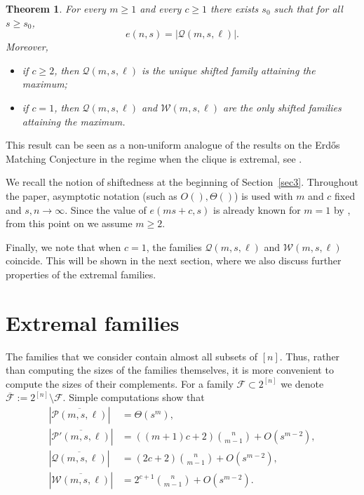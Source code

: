 \documentclass[12pt,a4paper]{article}
\newtheorem{theorem}{Theorem}
\begin{document}
\begin{theorem} \label{t.main}
For every $m\ge 1$ and every $c\ge 1$ there exists $s_0$ such that for all $s\ge s_0$,
\[
e(n,s)=|\mathcal Q(m,s,\ell)|.
\]
Moreover,
\begin{itemize}
    \item if $c\ge 2$, then $\mathcal Q(m,s,\ell)$ is the unique shifted family attaining the maximum;
    \item if $c=1$, then $\mathcal Q(m,s,\ell)$ and $\mathcal W(m,s,\ell)$ are the only shifted families attaining the maximum.
\end{itemize}
\end{theorem}
This result can be seen as a non-uniform analogue of the results on the Erd\H os Matching Conjecture in the regime when the clique is extremal, see \cite{Frankl_perfect_EMC, KoKu}. 

We recall the notion of shiftedness at the beginning of Section~\ref{sec3}. Throughout the paper, asymptotic notation (such as $O(), \Theta()$) is used with $m$ and $c$ fixed and $s,n\to\infty$. Since the value of $e(ms+c,s)$ is already known for $m=1$ by \cite{FK9}, from this point on we assume $m\ge 2$.

Finally, we note that when $c=1$, the families $\mathcal Q(m,s,\ell)$ and $\mathcal W(m,s,\ell)$ coincide. This will be shown in the next section, where we also discuss further properties of the extremal families.
	
	

\section{Extremal families}
The families that we consider contain almost all subsets of $[n]$. Thus, rather than computing the sizes of the families themselves, it is more convenient to compute the sizes of their complements. For a family $\mathcal{F} \subset 2^{[n]}$ we denote $\overline{\mathcal{F}}:=2^{[n]} \setminus \mathcal{F}.$ 
Simple computations show that
\begin{align*}
|\overline{\mathcal{P}(m, s, \ell)}| &= \Theta(s^m),\\
|\overline{\mathcal{P}'(m, s, \ell)}| &= ((m+1)c+2){n \choose m - 1} + O(s^{m-2}),\\
|\overline{\mathcal{Q}(m, s, \ell)}| &= (2c+2){n \choose m - 1} + O(s^{m-2}),\\
|\overline{\mathcal{W}(m, s, \ell)}| &= 2^{c+1}{n \choose m - 1} + O(s^{m-2}).
\end{align*}
\end{document}
